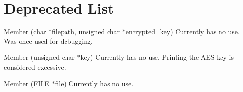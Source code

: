 \chapter{Deprecated List}
\hypertarget{deprecated}{}\label{deprecated}

\begin{DoxyRefList}
\item[Member \doxylink{tcfs__utils_8c_a4316eb58a0cb5afb4e90e75a55c9b3ea}{get\+\_\+encrypted\+\_\+key} (char \texorpdfstring{$\ast$}{*}filepath, unsigned char \texorpdfstring{$\ast$}{*}encrypted\+\_\+key)]\label{deprecated__deprecated000002}%
%
Currently has no use. Was once used for debugging.  
\item[Member \doxylink{tcfs__utils_8h_a8c1c24299a2b01f6157b051cb56ebc52}{print\+\_\+aes\+\_\+key} (unsigned char \texorpdfstring{$\ast$}{*}key)]\label{deprecated__deprecated000003}%
%
Currently has no use. Printing the AES key is considered excessive.  
\item[Member \doxylink{tcfs__utils_8c_a42623317bb0b1ff095b4d946dc085bd6}{read\+\_\+file} (FILE \texorpdfstring{$\ast$}{*}file)]\label{deprecated__deprecated000001}%
%
Currently has no use. 
\end{DoxyRefList}